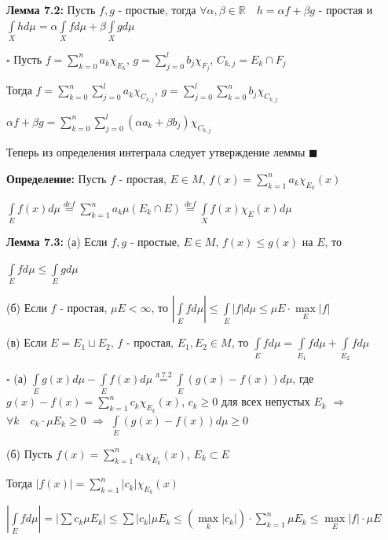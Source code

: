 \documentclass[a4paper]{report}
\begin{document}
\noindent\textbf{Лемма 7.2:} Пусть $f,g$ - простые, тогда $\forall\alpha,\beta\in\mathbb R\quad h=\alpha f+\beta g$ - простая и $\displaystyle\int\limits_X hd\mu=\alpha
\displaystyle\int\limits_X fd\mu+\beta\displaystyle\int\limits_X gd\mu$

\noindent $\square$ Пусть $f=\sum\limits_{k=0}^n a_k\chi_{E_k}$, $g=\sum\limits_{j=0}^l b_j\chi_{F_j}$, $C_{k,j}=E_k\cap F_j$

Тогда $f=\sum\limits_{k=0}^n\sum\limits_{j=0}^l a_k\chi_{C_{k,j}}$, $g=\sum\limits_{j=0}^l\sum\limits_{k=0}^n b_j\chi_{C_{k,j}}$

$\alpha f+\beta g=\sum\limits_{k=0}^n\sum\limits_{j=0}^l(\alpha a_k+\beta b_j)\chi_{C_{k,j}}$

Теперь из определения интеграла следует утверждение леммы $\blacksquare$
\bigskip
\bigskip

\noindent\textbf{Определение:} Пусть $f$ - простая, $E\in M$, $f(x)=\sum\limits_{k=1}^n a_k\chi_{E_k}(x)$

$\displaystyle\int\limits_E f(x)d\mu\stackrel{def}{=}\sum\limits_{k=1}^n a_k\mu(E_k\cap E)\stackrel{def}{=}\displaystyle\int\limits_X f(x)\chi_E(x)d\mu$
\bigskip

\noindent\textbf{Лемма 7.3:} (а) Если $f,g$ - простые, $E\in M$, $f(x)\le g(x)$ на $E$, то

 $\displaystyle\int\limits_E fd\mu\le\displaystyle\int\limits_E gd\mu$

(б) Если $f$ - простая, $\mu E<\infty$, то $|\displaystyle\int\limits_E fd\mu|\le\displaystyle\int\limits_E|f|d\mu\le\mu E\cdot\max\limits_E|f|$

(в) Если $E=E_1\sqcup E_2$, $f$ - простая, $E_1,E_2\in M$, то $\displaystyle\int\limits_E fd\mu=\displaystyle\int\limits_{E_1}fd\mu+\displaystyle\int\limits_{E_2}fd\mu$

\noindent $\square$ (а) $\displaystyle\int\limits_E g(x)d\mu-\displaystyle\int\limits_E f(x)d\mu\stackrel{\text{л }7.2}{=}\displaystyle\int\limits_E(g(x)-f(x))d\mu$, где $g(x)-f(x)=\sum\limits_{k=1}^n
c_k\chi_{E_k}(x)$, $c_k\ge0$ для всех непустых $E_k$ $\Rightarrow$ $\forall k\quad c_k\cdot\mu E_k\ge0$ $\Rightarrow$ $\displaystyle\int\limits_E(g(x)-f(x))d\mu\ge0$

(б) Пусть $f(x)=\sum\limits_{k=1}^n c_k\chi_{E_k}(x)$, $E_k\subset E$

Тогда $|f(x)|=\sum\limits_{k=1}^n|c_k|\chi_{E_k}(x)$

$|\displaystyle\int\limits_E fd\mu|=|\sum c_k\mu E_k|\le\sum|c_k|\mu E_k\le(\max\limits_k|c_k|)\cdot\sum\limits_{k=1}^n\mu E_k\le\max\limits_E|f|\cdot\mu E$
\end{document}
